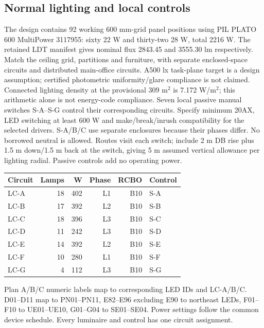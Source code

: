 \documentclass[11pt]{article}
\begin{document}
\subsection*{Normal lighting and local controls}
The design contains 92 working 600 mm-grid panel positions using PIL PLATO 600 MultiPower 3117955: sixty 22 W and thirty-two 28 W, total 2216 W. The retained LDT manifest gives nominal flux 2843.45 and 3555.30 lm respectively. Match the ceiling grid, partitions and furniture, with separate enclosed-space circuits and distributed main-office circuits. A500 lx task-plane target is a design assumption;  certified photometric uniformity/glare compliance is not claimed. Connected lighting density at the provisional 309 m$^2$ is 7.172 W/m$^2$;  this arithmetic alone is not energy-code compliance.
Seven local passive manual switches S-A--S-G control their corresponding circuits. Specify minimum 20AX, LED switching at least 600 W and make/break/inrush compatibility for the selected drivers. S-A/B/C use separate enclosures because their phases differ. No borrowed neutral is allowed. Routes visit each switch;  include 2 m DB rise plus 1.5 m down/1.5 m back at the switch, giving 5 m assumed vertical allowance per lighting radial. Passive controls add no operating power.
\begin{center}\begin{tabular}{lrrrrl}\toprule
Circuit & Lamps & W & Phase & RCBO & Control\\\midrule

LC-A & 18 & 402 & L1 & B10 & S-A \\
LC-B & 17 & 392 & L2 & B10 & S-B \\
LC-C & 18 & 396 & L3 & B10 & S-C \\
LC-D & 11 & 242 & L3 & B10 & S-D \\
LC-E & 14 & 392 & L2 & B10 & S-E \\
LC-F & 10 & 280 & L1 & B10 & S-F \\
LC-G & 4 & 112 & L3 & B10 & S-G \\

\bottomrule\end{tabular}\end{center}
Plan A/B/C numeric labels map to corresponding LED IDs and LC-A/B/C. D01--D11 map to PN01--PN11, E82--E96 excluding E90 to northeast LEDs, F01--F10 to UE01--UE10, G01--G04 to SE01--SE04. Power settings follow the common device schedule. Every luminaire and control has one circuit assignment.

\end{document}
